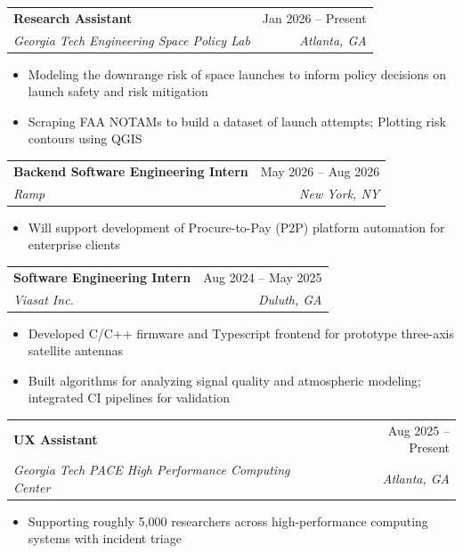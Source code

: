 \documentclass[letterpaper,11pt]{article}
\makeatletter
\newcommand{\resumeItem}[1]{
  \item\small{
    {#1 \vspace{-2pt}}
  }
}
\newcommand{\resumeSubheading}[4]{
  \vspace{-2pt}\item
    \begin{tabular*}{0.97\textwidth}[t]{l@{\extracolsep{\fill}}r}
      \textbf{#1} & #2 \\
      \textit{\small#3} & \textit{\small #4} \\
    \end{tabular*}\vspace{-7pt}
}
\newcommand{\resumeSubSubheading}[2]{
    \item
    \begin{tabular*}{0.97\textwidth}{l@{\extracolsep{\fill}}r}
      \textit{\small#1} & \textit{\small #2} \\
    \end{tabular*}\vspace{-7pt}
}
\newcommand{\resumeSubHeadingListEnd}{\end{itemize}}
\newcommand{\resumeItemListStart}{\begin{itemize}}
\newcommand{\resumeItemListEnd}{\end{itemize}\vspace{-5pt}}
\makeatother
\begin{document}

          \resumeSubheading
      {Research Assistant}{Jan 2026 -- Present}
      {Georgia Tech Engineering Space Policy Lab}{Atlanta, GA}
      \resumeItemListStart
        \resumeItem{Modeling the downrange risk of space launches to inform policy decisions on launch safety and risk mitigation}
        \resumeItem{Scraping FAA NOTAMs to build a dataset of launch attempts; Plotting risk contours using QGIS}
      \resumeItemListEnd

          \resumeSubheading
      {Backend Software Engineering Intern}{May 2026 -- Aug 2026}
      {Ramp}{New York, NY}
      \resumeItemListStart
        \resumeItem{Will support development of Procure-to-Pay (P2P) platform automation for enterprise clients }
      \resumeItemListEnd

    \resumeSubheading
      {Software Engineering Intern}{Aug 2024 -- May 2025}
      {Viasat Inc.}{Duluth, GA}
      \resumeItemListStart
        \resumeItem{Developed C/C++ firmware and Typescript frontend for prototype three-axis satellite antennas}
        \resumeItem{Built algorithms for analyzing signal quality and atmospheric modeling; integrated CI pipelines for validation}
      \resumeItemListEnd
     
      \resumeSubheading
      {UX Assistant}{Aug 2025 -- Present}
      {Georgia Tech PACE High Performance Computing Center}{Atlanta, GA}
      \resumeItemListStart
        \resumeItem{Supporting roughly 5,000 researchers across high-performance computing systems with incident triage}
      \resumeItemListEnd
      
\end{document}
